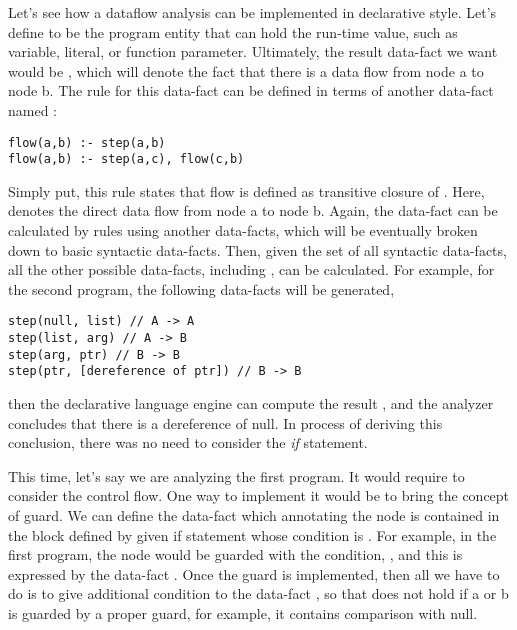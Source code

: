 Let's see how a dataflow analysis can be implemented in declarative style.
Let's define  to be the program entity that can hold the run-time
value, such as variable, literal, or function parameter.  Ultimately, the
result data-fact we want would be , which will denote the
fact that there is a data flow from node a to node b. The rule for this
data-fact can be defined in terms of another data-fact named :

\begin{lstlisting}[style=myDatalog,xleftmargin=2.5em]
flow(a,b) :- step(a,b)
flow(a,b) :- step(a,c), flow(c,b)
\end{lstlisting}

Simply put, this rule states that flow is defined as transitive closure of
.  Here,  denotes the direct data flow from node a to
node b. Again, the data-fact  can be calculated by rules using another
data-facts, which will be eventually broken down to basic syntactic data-facts.
Then, given the set of all syntactic data-facts, all the other possible
data-facts, including , can be calculated. For example, for the second
program, the following data-facts will be generated,

\begin{lstlisting}[style=myDatalog,xleftmargin=2.5em]
step(null, list) // A -> A
step(list, arg) // A -> B
step(arg, ptr) // B -> B
step(ptr, [dereference of ptr]) // B -> B
\end{lstlisting}

then the declarative language engine can compute the result , and the analyzer concludes that there is a dereference
of null. In process of deriving this conclusion, there was no need to consider
the \textit{if} statement.

This time, let's say we are analyzing the first program. It would require to
consider the control flow.  One way to implement it would be to bring the
concept of guard. We can define the data-fact  which
annotating the node is contained in the block defined by given if statement
whose condition is .  For example, in the first program, the
 node would be guarded with the condition, , and
this is expressed by the data-fact .  Once the guard
is implemented, then all we have to do is to give additional condition to the
data-fact , so that  does not hold if a or b
is guarded by a proper guard, for example, it contains comparison with null.

